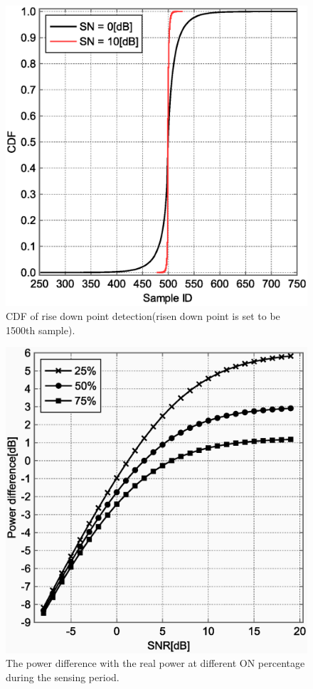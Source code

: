 \begin{figure}[t]
\centering
\includegraphics[width=120mm]{cdf_ON2OFF.eps}
\caption{CDF of rise down point detection(risen down point is set to be 1500th sample).}
\label{cdf_on2off}
\end{figure}


\begin{figure}[t]
\centering
\includegraphics[width=120mm]{per.eps}
\caption{The power difference with the real power at different ON percentage during the sensing period.}
\label{per}
\end{figure}
